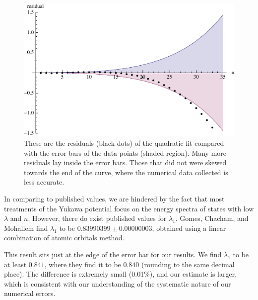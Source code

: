 \documentclass[12pt,twoside]{reedthesis}
\begin{document}
\begin{figure}[h]
\centering
\includegraphics{Figures/quaderr}
\caption[Residuals for quadratic fit]{These are the residuals (black dots) of the quadratic fit compared with the error bars of the data points (shaded region). Many more residuals lay inside the error bars. Those that did not were skewed towards the end of the curve, where the numerical data collected is less accurate.}
\label{fig:quaderr}
\end{figure}


In comparing to published values, we are hindered by the fact that most treatments of the Yukawa potential focus on the energy spectra of states with low $\lambda$ and $n$. However, there do exist published values for $\lambda_1$. Gomes, Chacham, and Mohallem find  $\lambda_1$ to be $0.83990399 \pm 0.00000003$, obtained using a linear combination of atomic orbitals method\cite{PhysRevA.50.228}.

This result sits just at the edge of the error bar for our results. We find $\lambda_1$ to be at least $0.841$, where they find it to be $0.840$ (rounding to the same decimal place). The difference is extremely small (0.01\%), and our estimate is larger, which is consistent with our understanding of the systematic nature of our numerical errors. 
\end{document}
